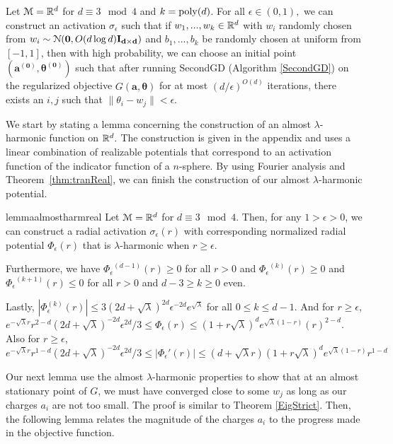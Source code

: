 %
%
\begin{theorem}\label{almostHarmSGD}
  Let $\mathcal{M} = {\mathbb{R}}^{d}$ for $d \equiv 3 \mod 4$ and $k = \mathrm{poly}(d)$. For all $\epsilon \in (0,1),$ we can construct an activation $\sigma_\epsilon$ such that if $w_1,...,w_k \in {\mathbb{R}}^d$ with $w_i$ randomly chosen from $w_i \sim  \mathcal{N}({\bf 0}, O(d\log d){\bf I_{d\times d}})$ and $b_1,...,b_k$ be randomly chosen at uniform from $[-1,1]$, then with high probability, we can choose an initial point $(\boldsymbol{a^{(0)}, \theta^{(0)}})$ such that after running SecondGD (Algorithm \ref{SecondGD}) on the regularized objective $G(\boldsymbol{a,\theta})$ for at most $(d/\epsilon)^{O(d)}$ iterations, there exists an $i, j$ such that $\|\theta_i - w_j\| <  \epsilon$.
\end{theorem}
%
We start by stating a lemma concerning the construction of an almost
$\lambda$-harmonic function on ${\mathbb{R}}^d.$ The construction is given in the appendix and uses a linear combination of realizable potentials that correspond to an activation function of the indicator function of a $n$-sphere. By using Fourier analysis and Theorem~\ref{thm:tranReal}, we can finish the construction of our almost $\lambda$-harmonic potential.%
%
\begin{restatable}{lemma}{almostharmreal}
\label{almostHarmReal}
Let $\mathcal{M} = {\mathbb{R}}^d$ for $d \equiv 3 \mod 4$. Then, for any $1 > \epsilon > 0$, we can construct a radial activation $\sigma_\epsilon(r)$ with corresponding normalized radial potential $\Phi_\epsilon(r)$ that is $\lambda$-harmonic when $r \geq \epsilon$.

Furthermore, we have ${\Phi_\epsilon}^{(d-1)}(r) \geq 0$ for all $r  > 0$ and ${\Phi_\epsilon}^{(k)}(r) \geq 0$ and ${\Phi_\epsilon}^{(k+1)}(r)\leq 0$ for all $r > 0$ and $d - 3 \geq k \geq 0 $ even.

Lastly, $|{\Phi}_\epsilon^{(k)}(r)| \leq 3(2d + \sqrt{\lambda})^{2d} \epsilon^{-2d}e^{\sqrt{\lambda}}$ for all $0 \leq k \leq d-1$. And for $r \geq \epsilon$, $e^{-\sqrt{\lambda}r}r^{2-d}(2d+\sqrt{\lambda})^{-2d}\epsilon^{2d}/3\leq {\Phi}_\epsilon(r) \leq (1+r\sqrt{\lambda})^de^{\sqrt{\lambda}(1-r)}(r)^{2-d}$. Also for $r \geq \epsilon$, $ e^{-\sqrt{\lambda}r}r^{1-d}(2d+\sqrt{\lambda})^{-2d}\epsilon^{2d}/3 \leq |{\Phi}_\epsilon'(r)| \leq (d+\sqrt{\lambda}r)(1+ r\sqrt{\lambda})^de^{\sqrt{\lambda}(1- r)} r^{1-d}$
\end{restatable}
%
%
Our next lemma use the almost $\lambda$-harmonic properties to show that at an almost stationary point of $G$, we must have converged close to some $w_j$ as long as our charges $a_i$ are not too small. The proof is similar to Theorem \ref{EigStrict}. Then, the following lemma relates the magnitude of the charges $a_i$ to the progress made in the objective function. 
